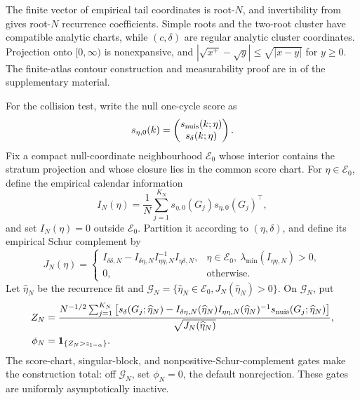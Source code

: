 The finite vector of empirical tail coordinates is root-\(N\), and
invertibility from  gives root-\(N\)
recurrence coefficients.  Simple roots and the two-root cluster have
compatible analytic charts, while \((c,\delta)\) are regular analytic cluster
coordinates.  Projection onto \([0,\infty)\) is nonexpansive, and
\(|\sqrt{x^+}-\sqrt y|\le\sqrt{|x-y|}\) for \(y\ge0\).  The finite-atlas
contour construction and measurability proof are in
 of the supplementary material.

For the collision test, write the null one-cycle score as
\[
 s_{\eta,0}(k)=
 \begin{pmatrix}s_{\rm nuis}(k;\eta)\\s_\delta(k;\eta)\end{pmatrix}.
\]
Fix a compact null-coordinate neighbourhood \(\mathcal E_0\) whose interior
contains the stratum projection and whose closure lies in the common score
chart.  For \(\eta\in\mathcal E_0\), define the empirical calendar information
\begin{equation}
 I_N(\eta)=\frac1N\sum_{j=1}^{K_N}
 s_{\eta,0}(G_j)s_{\eta,0}(G_j)^\top,
\label{eq:main-empirical-information}
\end{equation}
and set \(I_N(\eta)=0\) outside \(\mathcal E_0\).  Partition it according to
\((\eta,\delta)\), and define its empirical Schur complement by
\begin{equation}
 J_N(\eta)=
 \begin{cases}
 I_{\delta\delta,N}-I_{\delta\eta,N}
 I_{\eta\eta,N}^{-1}I_{\eta\delta,N},
 &\eta\in\mathcal E_0,\ \lambda_{\min}(I_{\eta\eta,N})>0,\\
 0,&\text{otherwise}.
 \end{cases}
\label{eq:main-empirical-schur-complement}
\end{equation}
Let \(\widehat\eta_N\) be the recurrence fit and
\(\mathcal G_N=\{\widehat\eta_N\in\mathcal E_0,
J_N(\widehat\eta_N)>0\}\).  On \(\mathcal G_N\), put
\begin{equation}
\begin{aligned}
 Z_N&=\frac{N^{-1/2}\sum_{j=1}^{K_N}
 \left[s_\delta(G_j;\widehat\eta_N)
 -I_{\delta\eta,N}(\widehat\eta_N)
 I_{\eta\eta,N}(\widehat\eta_N)^{-1}
 s_{\rm nuis}(G_j;\widehat\eta_N)\right]}
 {\sqrt{J_N(\widehat\eta_N)}},\\
 \phi_N&=\mathbf1_{\{Z_N>z_{1-\alpha}\}}.
\end{aligned}
\label{eq:main-residualized-score-test}
\end{equation}
The score-chart, singular-block, and nonpositive-Schur-complement gates make
the construction total: off \(\mathcal G_N\), set \(\phi_N=0\), the default
nonrejection.  These gates are uniformly asymptotically inactive.

